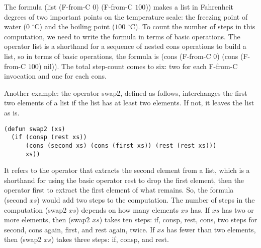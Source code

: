 The formula \textsf{(list (F-from-C $0$) (F-from-C $100$))}
makes a list in Fahrenheit degrees of two important
points on the temperature scale:
the freezing point of water ($0$ $^\circ$C) and the boiling point ($100$ $^\circ$C).
To count the number of steps in this computation,
we need to write the formula in terms of basic operations.
The operator \textsf{list} is a shorthand for a sequence of nested
\textsf{cons} operations to build a list,
so in terms of basic operations, the formula is
\textsf{(cons (F-from-C $0$) (cons (F-from-C $100$) nil))}.
The total step-count comes to six: two for each \textsf{F-from-C} invocation
and one for each cons.

Another example:
the operator \textsf{swap2}, defined as follows, interchanges the
first two elements of a list if the list has at least two elements.
If not, it leaves the list as is.

\begin{Verbatim}
(defun swap2 (xs)
  (if (consp (rest xs))
      (cons (second xs) (cons (first xs)) (rest (rest xs)))
      xs))
\end{Verbatim}

It refers to the operator that extracts the second element from a list,
which is a shorthand for using the basic operator \textsf{rest} to drop the
first element, then the operator \textsf{first} to extract the first element
of what remains.
\label{steps-in-second-op}So,
the formula \textsf{(second $xs$)} would add two steps
to the computation. The number of steps in the computation \textsf{(swap2 $xs$)}
depends on how many elements $xs$ has. If $xs$ has two or more elements,
then \textsf{(swap2 $xs$)} takes ten steps:
\textsf{if}, \textsf{consp}, \textsf{rest}, \textsf{cons},
two steps for \textsf{second},
\textsf{cons} again, \textsf{first}, and \textsf{rest} again, twice.
If $xs$ has fewer than two elements, then \textsf{(swap2 $xs$)} takes three steps:
\textsf{if}, \textsf{consp}, and \textsf{rest}.

